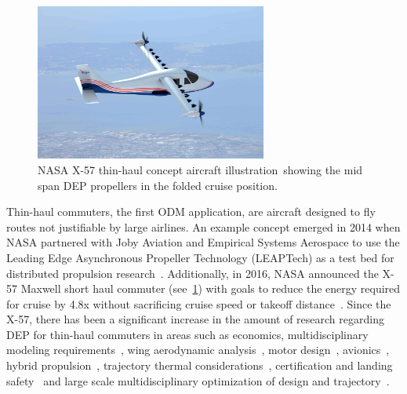 \documentclass[conf]{new-aiaa}
\begin{document}
\begin{figure}[htbp]
    \centering
    \includegraphics[trim={3.5cm 6.0cm 4.0cm 4.5cm},clip,width=3.0in]{leaptech}
    \caption[NASA X-57 thin-haul concept aircraft illustration showing the mid span DEP propellers in the folded cruise position.]{NASA X-57 thin-haul concept aircraft illustration\footnotemark~showing the mid span DEP propellers in the folded cruise position.}
    \label{f:leaptech1}
\end{figure}


Thin-haul commuters, the first ODM application, are aircraft designed to fly routes not justifiable by large airlines. An example concept emerged in 2014 when NASA partnered with Joby Aviation and Empirical Systems Aerospace to use the Leading Edge Asynchronous Propeller Technology (LEAPTech) as a test bed for distributed propulsion research~\cite{Stoll:2014aa}. Additionally, in 2016, NASA announced the X-57 Maxwell short haul commuter (see~\cref{f:leaptech1}) with goals to reduce the energy required for cruise by 4.8x without sacrificing cruise speed or takeoff distance~\cite{Borer:2017aa}. Since the X-57, there has been a significant increase in the amount of research regarding DEP for thin-haul commuters in areas such as economics\cite{Harish:2016aa}, multidisciplinary modeling requirements~\cite{Patterson:2014aa}, wing aerodynamic analysis~\cite{Deere:2017aa, Borer:2017aa, Stoll:2014aa}, motor design~\cite{Dubois:2016aa}, avionics~\cite{Clarke:2017aa}, hybrid propulsion~\cite{Papathakis:2018aa}, trajectory thermal considerations~\cite{Falck:2017aa}, certification and landing safety~\cite{Patterson:2017aa} and large scale multidisciplinary optimization of design and trajectory~\cite{Hwang:2018aa}.
\end{document}

